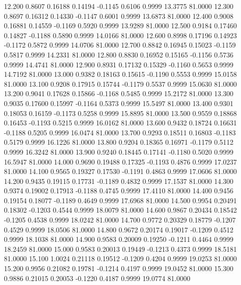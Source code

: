   12.200   0.8607   0.16188   0.14194  -0.1145   0.6106   0.9999  13.3775  81.0000
  12.300   0.8697   0.16312   0.14330  -0.1147   0.6001   0.9999  13.6873  81.0000
  12.400   0.9008   0.16881   0.14559  -0.1169   0.5920   0.9999  13.9289  81.0000
  12.500   0.9184   0.17460   0.14827  -0.1188   0.5890   0.9999  14.0166  81.0000
  12.600   0.8998   0.17196   0.14923  -0.1172   0.5872   0.9999  14.0706  81.0000
  12.700   0.8842   0.16945   0.15023  -0.1159   0.5817   0.9999  14.2331  81.0000
  12.800   0.8830   0.16952   0.15165  -0.1156   0.5736   0.9999  14.4741  81.0000
  12.900   0.8931   0.17132   0.15329  -0.1160   0.5653   0.9999  14.7192  81.0000
  13.000   0.9382   0.18163   0.15615  -0.1190   0.5553   0.9999  15.0158  81.0000
  13.100   0.9208   0.17915   0.15744  -0.1179   0.5537   0.9999  15.0630  81.0000
  13.200   0.9041   0.17628   0.15866  -0.1168   0.5485   0.9999  15.2172  81.0000
  13.300   0.9035   0.17600   0.15997  -0.1164   0.5373   0.9999  15.5497  81.0000
  13.400   0.9301   0.18053   0.16159  -0.1173   0.5258   0.9999  15.8895  81.0000
  13.500   0.9559   0.18868   0.16453  -0.1193   0.5215   0.9999  16.0162  81.0000
  13.600   0.9432   0.18724   0.16631  -0.1188   0.5205   0.9999  16.0474  81.0000
  13.700   0.9293   0.18511   0.16803  -0.1183   0.5179   0.9999  16.1226  81.0000
  13.800   0.9204   0.18365   0.16971  -0.1179   0.5112   0.9999  16.3242  81.0000
  13.900   0.9240   0.18445   0.17141  -0.1180   0.5020   0.9999  16.5947  81.0000
  14.000   0.9690   0.19488   0.17325  -0.1193   0.4876   0.9999  17.0237  81.0000
  14.100   0.9565   0.19327   0.17530  -0.1191   0.4863   0.9999  17.0606  81.0000
  14.200   0.9435   0.19115   0.17731  -0.1189   0.4832   0.9999  17.1537  81.0000
  14.300   0.9374   0.19002   0.17913  -0.1188   0.4745   0.9999  17.4110  81.0000
  14.400   0.9456   0.19154   0.18077  -0.1189   0.4649   0.9999  17.6968  81.0000
  14.500   0.9954   0.20491   0.18302  -0.1203   0.4544   0.9999  18.0079  81.0000
  14.600   0.9867   0.20434   0.18542  -0.1205   0.4538   0.9999  18.0242  81.0000
  14.700   0.9772   0.20329   0.18779  -0.1207   0.4529   0.9999  18.0506  81.0000
  14.800   0.9672   0.20174   0.19017  -0.1209   0.4512   0.9999  18.1038  81.0000
  14.900   0.9583   0.20009   0.19250  -0.1211   0.4464   0.9999  18.2459  81.0000
  15.000   0.9583   0.20013   0.19449  -0.1213   0.4373   0.9999  18.5181  81.0000
  15.100   1.0024   0.21118   0.19512  -0.1209   0.4204   0.9999  19.0253  81.0000
  15.200   0.9956   0.21082   0.19781  -0.1214   0.4197   0.9999  19.0452  81.0000
  15.300   0.9886   0.21015   0.20053  -0.1220   0.4187   0.9999  19.0774  81.0000
